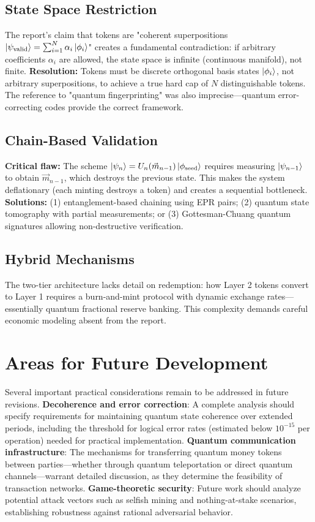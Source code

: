 \documentclass[a4paper,10.5pt,twoside]{article}
\begin{document}
\subsection{State Space Restriction}

The report's claim that tokens are "coherent superpositions $\ket{\psi_{\text{valid}}} = \sum_{i=1}^{N} \alpha_i \ket{\phi_i}$" creates a fundamental contradiction: if arbitrary coefficients $\alpha_i$ are allowed, the state space is infinite (continuous manifold), not finite. \textbf{Resolution:} Tokens must be discrete orthogonal basis states $\ket{\phi_i}$, not arbitrary superpositions, to achieve a true hard cap of $N$ distinguishable tokens. The reference to "quantum fingerprinting" was also imprecise—quantum error-correcting codes provide the correct framework.

\subsection{Chain-Based Validation}

\textbf{Critical flaw:} The scheme $\ket{\psi_n} = U_n(\vec{m}_{n-1}) \ket{\phi_{\text{seed}}}$ requires measuring $\ket{\psi_{n-1}}$ to obtain $\vec{m}_{n-1}$, which destroys the previous state. This makes the system deflationary (each minting destroys a token) and creates a sequential bottleneck. \textbf{Solutions:} (1) entanglement-based chaining using EPR pairs; (2) quantum state tomography with partial measurements; or (3) Gottesman-Chuang quantum signatures allowing non-destructive verification.

\subsection{Hybrid Mechanisms}

The two-tier architecture lacks detail on redemption: how Layer 2 tokens convert to Layer 1 requires a burn-and-mint protocol with dynamic exchange rates—essentially quantum fractional reserve banking. This complexity demands careful economic modeling absent from the report.



\section{Areas for Future Development}

Several important practical considerations remain to be addressed in future revisions. \textbf{Decoherence and error correction}: A complete analysis should specify requirements for maintaining quantum state coherence over extended periods, including the threshold for logical error rates (estimated below $10^{-15}$ per operation) needed for practical implementation. \textbf{Quantum communication infrastructure}: The mechanisms for transferring quantum money tokens between parties—whether through quantum teleportation or direct quantum channels—warrant detailed discussion, as they determine the feasibility of transaction networks. \textbf{Game-theoretic security}: Future work should analyze potential attack vectors such as selfish mining and nothing-at-stake scenarios, establishing robustness against rational adversarial behavior.
\end{document}

